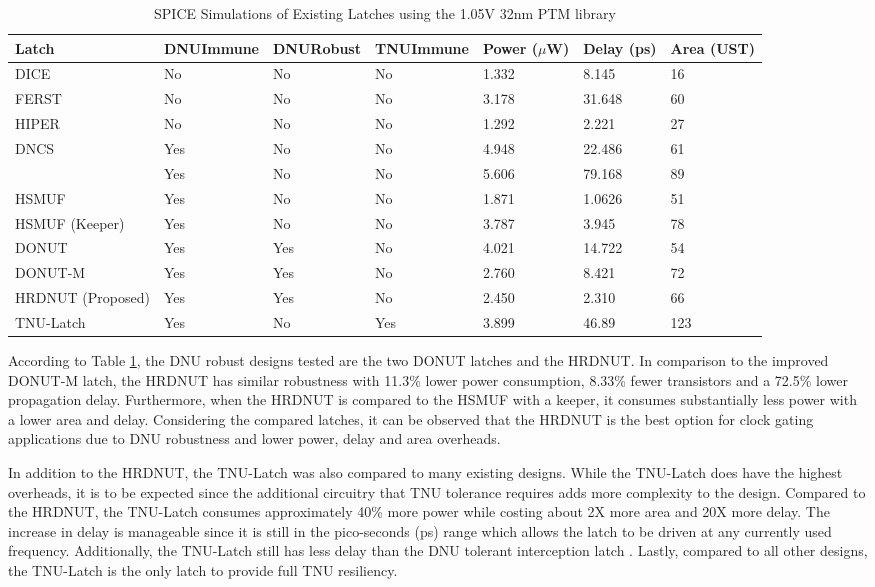 \begin{table}[h]
\begin{center}
	\caption{SPICE Simulations of Existing Latches using the 1.05V 32nm PTM library }
	\label{table:rtable}
	\begin{tabular}{|m{5em}|m{3.5em}|m{3em}|m{3.5em}|m{2em}|m{2.5em}|m{2em}|}
	\hline
	Latch & DNU\newline Immune & DNU\newline Robust & TNU\newline Immune & Power ($\mu$W) & Delay (ps) & Area (UST)\\ 
	\hline
	DICE & No & No & No & 1.332 & 8.145 & 16 \\
	\hline
	FERST & No & No & No & 3.178 & 31.648 & 60 \\
	\hline
	HIPER & No & No & No & 1.292 & 2.221 & 27 \\
	\hhline{|=|=|=|=|=|=|=|}
	DNCS & Yes & No & No & 4.948 & 22.486 & 61 \\
	\hline
	\cite{Inter} & Yes & No & No & 5.606 & 79.168 & 89 \\
	\hline
	HSMUF & Yes & No & No & 1.871 & 1.0626 & 51 \\
	\hline
	HSMUF (Keeper) & Yes & No & No & 3.787 & 3.945 & 78 \\
	\hhline{|=|=|=|=|=|=|=|}
	DONUT \cite{DONUT} & Yes & Yes & No & 4.021 & 14.722 & 54 \\ 
	\hline
	DONUT-M & Yes & Yes & No & 2.760 & 8.421 & 72\\
	\hline
	HRDNUT (Proposed) & Yes & Yes & No & 2.450 & 2.310 & 66 \\
	\hline
	TNU-Latch & Yes & No & Yes & 3.899 & 46.89 & 123 \\
	\hline
	\end{tabular}
\end{center}
\end{table}

According to Table \ref{table:rtable}, the DNU robust designs tested are the two DONUT latches and the HRDNUT. In comparison to the improved DONUT-M latch, the HRDNUT has similar robustness with 11.3\% lower power consumption, 8.33\% fewer transistors and a 72.5\% lower propagation delay. Furthermore, when the HRDNUT is compared to the HSMUF with a keeper, it consumes substantially less power with a lower area and delay. Considering the compared latches, it can be observed that the HRDNUT is the best option for clock gating applications due to DNU robustness and lower power, delay and area overheads.

In addition to the HRDNUT, the TNU-Latch was also compared to many existing designs. While the TNU-Latch does have the highest overheads, it is to be expected since the additional circuitry that TNU tolerance requires adds more complexity to the design. Compared to the HRDNUT, the TNU-Latch consumes approximately 40\% more power while costing about 2X more area and 20X more delay. The increase in delay is manageable since it is still in the pico-seconds (ps) range which allows the latch to be driven at any currently used frequency. Additionally, the TNU-Latch still has less delay than the DNU tolerant interception latch \cite{Inter}. Lastly, compared to all other designs, the TNU-Latch is the only latch to provide full TNU resiliency.